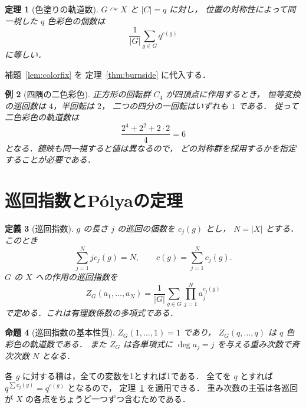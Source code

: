 \documentclass[a5paper,10pt,onecolumn]{jsarticle}
\makeatletter
\theoremstyle{mathnotetheorem}
\newtheorem{theorem}{定理}[section]
\newtheorem{definition}[theorem]{定義}
\newtheorem{proposition}[theorem]{命題}
\newtheorem{example}[theorem]{例}
\renewcommand{\proofname}{証明}
\renewenvironment{proof}[1][\proofname]{%
  \par\pushQED{\qed}\normalfont\topsep4\p@\@plus2\p@\relax
  \trivlist\item[\hskip\labelsep\bfseries #1]\ignorespaces
}{\popQED\endtrivlist\@endpefalse}
\makeatother
\begin{document}
\begin{theorem}[色塗りの軌道数]\label{thm:colororbits}
$G\curvearrowright X$ と $|C|=q$ に対し，
位置の対称性によって同一視した $q$ 色彩色の個数は
\[
 \frac1{|G|}\sum_{g\in G}q^{c(g)}
\]
に等しい．
\end{theorem}
\begin{proof}
補題~\ref{lem:colorfix} を
定理~\ref{thm:burnside} に代入する．
\end{proof}

\begin{example}[四隅の二色彩色]
正方形の回転群 $C_4$ が四頂点に作用するとき，
恒等変換の巡回数は $4$，半回転は $2$，
二つの四分の一回転はいずれも $1$ である．
従って二色彩色の軌道数は
\[
 \frac{2^4+2^2+2\cdot2}{4}=6
\]
となる．鏡映も同一視すると値は異なるので，
どの対称群を採用するかを指定することが必要である．
\end{example}

\section{巡回指数とP\'olyaの定理}
\begin{definition}[巡回指数]
$g$ の長さ $j$ の巡回の個数を $c_j(g)$ とし，
$N=|X|$ とする．このとき
\[
 \sum_{j=1}^N j c_j(g)=N,
 \qquad c(g)=\sum_{j=1}^N c_j(g).
\]
$G$ の $X$ への作用の\emph{巡回指数}を
\begin{equation}\label{eq:cycleindex}
 Z_G(a_1,\ldots,a_N)
 =\frac1{|G|}\sum_{g\in G}
  \prod_{j=1}^N a_j^{c_j(g)}
\end{equation}
で定める．これは有理数係数の多項式である．
\end{definition}

\begin{proposition}[巡回指数の基本性質]
$Z_G(1,\ldots,1)=1$ であり，
$Z_G(q,\ldots,q)$ は $q$ 色彩色の軌道数である．
また $Z_G$ は各単項式に
$\deg a_j=j$ を与える重み次数で斉次次数 $N$ となる．
\end{proposition}
\begin{proof}
各 $g$ に対する積は，全ての変数を1とすれば1である．
全てを $q$ とすれば $q^{\sum c_j(g)}=q^{c(g)}$ となるので，
定理~\ref{thm:colororbits} を適用できる．
重み次数の主張は各巡回が $X$ の各点をちょうど一つずつ含むためである．
\end{proof}
\end{document}
